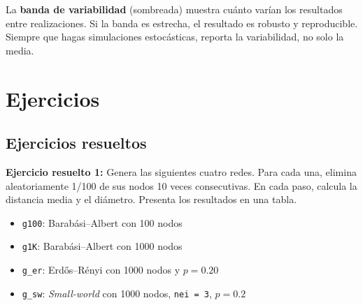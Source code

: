 \documentclass[
  letterpaper,
  DIV=11,
  numbers=noendperiod]{scrreprt}
\providecommand{\tightlist}{%
  \setlength{\itemsep}{0pt}\setlength{\parskip}{0pt}}
\begin{document}
\begin{tcolorbox}[enhanced jigsaw, toprule=.15mm, colframe=quarto-callout-tip-color-frame, coltitle=black, titlerule=0mm, colback=white, breakable, leftrule=.75mm, arc=.35mm, bottomtitle=1mm, toptitle=1mm, rightrule=.15mm, bottomrule=.15mm, left=2mm, title=\textcolor{quarto-callout-tip-color}{\faLightbulb}\hspace{0.5em}{💡 Concepto clave}, colbacktitle=quarto-callout-tip-color!10!white, opacityback=0, opacitybacktitle=0.6]

La \textbf{banda de variabilidad} (sombreada) muestra cuánto varían los
resultados entre realizaciones. Si la banda es estrecha, el resultado es
robusto y reproducible. Siempre que hagas simulaciones estocásticas,
reporta la variabilidad, no solo la media.

\end{tcolorbox}

\section{Ejercicios}\label{ejercicios-4}

\subsection*{Ejercicios resueltos}\label{ejercicios-resueltos-4}

\textbf{Ejercicio resuelto 1:} Genera las siguientes cuatro redes. Para
cada una, elimina aleatoriamente 1/100 de sus nodos 10 veces
consecutivas. En cada paso, calcula la distancia media y el diámetro.
Presenta los resultados en una tabla.

\begin{itemize}
\tightlist
\item
  \texttt{g100}: Barabási--Albert con 100 nodos
\item
  \texttt{g1K}: Barabási--Albert con 1000 nodos
\item
  \texttt{g\_er}: Erdős--Rényi con 1000 nodos y \(p = 0.20\)
\item
  \texttt{g\_sw}: \emph{Small-world} con 1000 nodos, \texttt{nei\ =\ 3},
  \(p = 0.2\)
\end{itemize}
\end{document}
